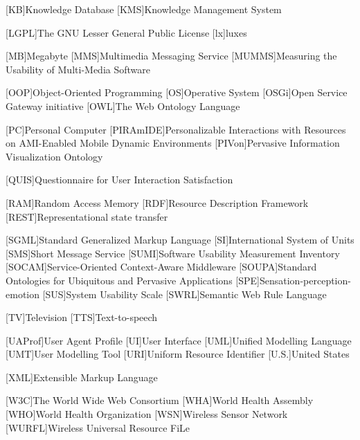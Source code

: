 \begin{acronym}[dynui]
  [KB]{Knowledge Database}
  [KMS]{Knowledge Management System}
  
  [LGPL]{The GNU Lesser General Public License}
  [lx]{luxes}
  
  [MB]{Megabyte}
  [MMS]{Multimedia Messaging Service}
  [MUMMS]{Measuring the Usability of Multi-Media Software}
  
  [OOP]{Object-Oriented Programming}
  [OS]{Operative System}
  [OSGi]{Open Service Gateway initiative}
  [OWL]{The Web Ontology Language}
  
  [PC]{Personal Computer}
  [PIRAmIDE]{Personalizable Interactions with Resources on AMI-Enabled Mobile Dynamic Environments}
  [PIVon]{Pervasive Information Visualization Ontology}
  
  [QUIS]{Questionnaire for User Interaction Satisfaction}
  
  [RAM]{Random Access Memory}
  [RDF]{Resource Description Framework}
  [REST]{Representational state transfer}
  
  [SGML]{Standard Generalized Markup Language}
  [SI]{International System of Units}
  [SMS]{Short Message Service}
  [SUMI]{Software Usability Measurement Inventory}
  [SOCAM]{Service-Oriented Context-Aware Middleware}
  [SOUPA]{Standard Ontologies for Ubiquitous and Pervasive Applications}
  [SPE]{Sensation-perception-emotion}
  [SUS]{System Usability Scale}
  [SWRL]{Semantic Web Rule Language}
  
  [TV]{Television}
  [TTS]{Text-to-speech}
  
  [UAProf]{User Agent Profile}
  [UI]{User Interface} %
  [UML]{Unified Modelling Language}
  [UMT]{User Modelling Tool}
  [URI]{Uniform Resource Identifier}
  [U.S.]{United States}
  
  [XML]{Extensible Markup Language}
  
  [W3C]{The World Wide Web Consortium}
  [WHA]{World Health Assembly}
  [WHO]{World Health Organization}
  [WSN]{Wireless Sensor Network}
  [WURFL]{Wireless Universal Resource FiLe}

\end{acronym}
